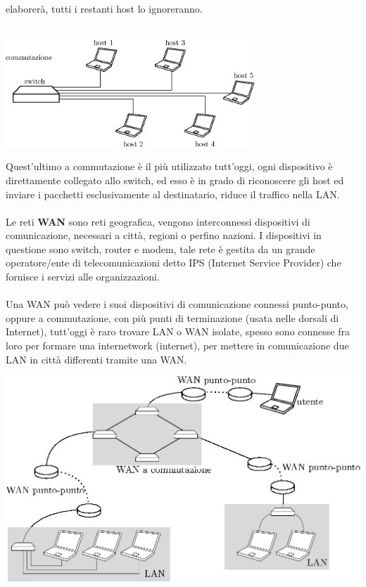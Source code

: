 \documentclass[12pt, letterpaper]{article}
\newcommand{\acc}{\\\hphantom{}\\}
\begin{document}
elaborerà, tutti i restanti host lo ignoreranno.\acc \begin{center}
    \includegraphics[width=0.7\textwidth ]{images/commutazione.eps}
\end{center}
Quest'ultimo a commutazione è il più utilizzato tutt'oggi, ogni dispositivo è direttamente collegato allo switch, ed esso è
in grado di riconoscere gli host ed inviare i pacchetti esclusivamente al destinatario, riduce il traffico nella LAN.\acc
Le reti \textbf{WAN} sono reti geografica, vengono interconnessi dispositivi di comunicazione, necessari a città, regioni o
perfino nazioni. I dispositivi in questione sono switch, router e modem, tale rete è gestita da un grande operatore/ente di
telecomunicazioni detto IPS (Internet Service Provider) che fornisce i servizi alle organizzazioni.\acc Una WAN può vedere i suoi
dispositivi di comunicazione connessi punto-punto, oppure a commutazione, con più punti di terminazione (usata nelle dorsali di
Internet), tutt'oggi è raro trovare LAN o WAN isolate, spesso sono connesse fra loro per formare una internetwork (internet), per
mettere in comunicazione due LAN in città differenti tramite una WAN.\begin{center}
    \includegraphics[width=1\textwidth ]{images/internetwork.eps}
\end{center}
\end{document}

